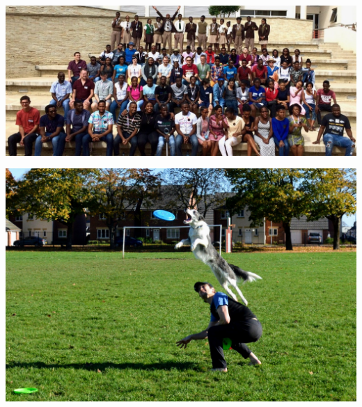 \documentclass{beamer}
\begin{document}
\begin{frame}
    \begin{center}
        \includegraphics[width=.9\textwidth]{assets/pycon.jpg}
    \end{center}
\end{frame}

\begin{frame}
    \begin{center}
        \includegraphics[width=.9\textwidth]{assets/flyingdog.jpg}
    \end{center}
\end{frame}
\end{document}
